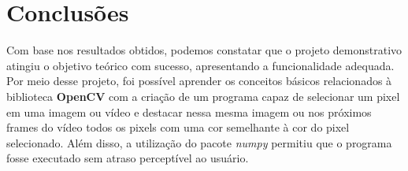\documentclass{bmvc2k}
\begin{document}

\section{Conclusões}
Com base nos resultados obtidos, podemos constatar que o projeto demonstrativo atingiu o objetivo teórico com sucesso, apresentando a funcionalidade adequada. Por meio desse projeto, foi possível aprender os conceitos básicos relacionados à biblioteca {\bf OpenCV} com a criação de um programa capaz de selecionar um pixel em uma imagem ou vídeo e destacar nessa mesma imagem ou nos próximos frames do vídeo todos os pixels com uma cor semelhante à cor do pixel selecionado. Além disso, a utilização do pacote {\em numpy} permitiu que o programa fosse executado sem atraso perceptível ao usuário.




\end{document}
